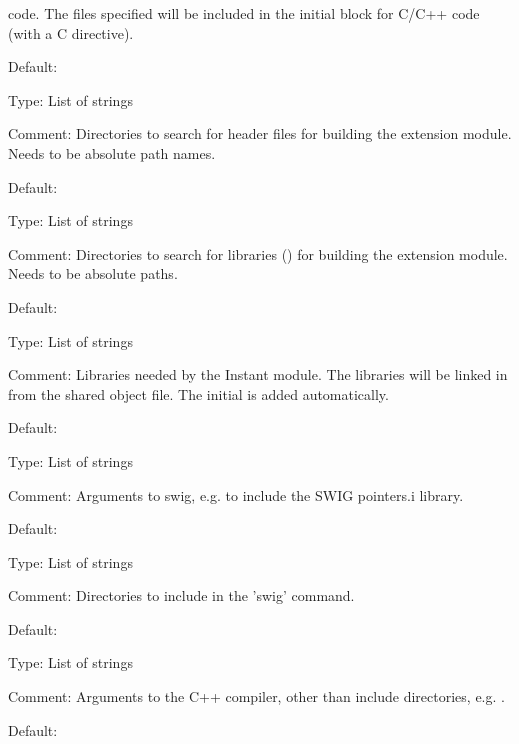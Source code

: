      code. The files specified will be included in the initial block for C/C++
      code (with a C directive).
  \eit
\item {}
  \bit
    \item Default: \emp{[]}
    \item Type: List of strings
    \item Comment: Directories to search for header files for building the
      extension module. Needs to be absolute path names.
  \eit
\item {}
  \bit
    \item Default: \emp{[]}
    \item Type: List of strings
    \item Comment: Directories to search for libraries () for building
      the extension module. Needs to be absolute paths. 
  \eit
\item {}
  \bit
    \item Default: \emp{[]}
    \item Type: List of strings
    \item Comment: Libraries needed by the Instant module. The libraries will
      be linked in from the shared object file. The initial  is added
      automatically.
  \eit
\item {}
  \bit
    \item Default: 
    \item Type: List of strings
    \item Comment: Arguments to swig, e.g. \emp{['-lpointers.i']}
      to include the SWIG pointers.i library.
  \eit
\item {}
  \bit
    \item Default: \emp{[]}
    \item Type: List of strings
    \item Comment: Directories to include in the 'swig' command.
  \eit
\item {}
  \bit
    \item Default: \emp{['-O2']}
    \item Type: List of strings
    \item Comment: Arguments to the C++ compiler, other than include
      directories, e.g. .
  \eit
\item {}
  \bit
    \item Default: \emp{[]}
